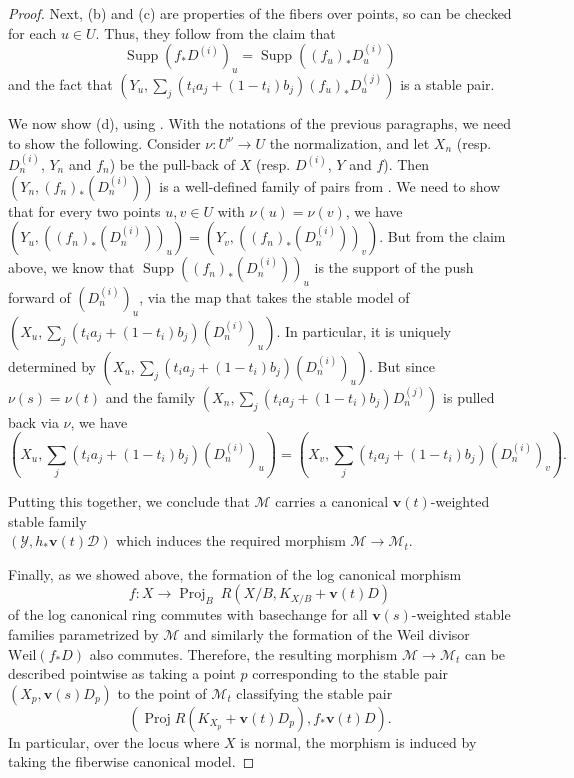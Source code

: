 \documentclass[11pt]{amsart}
\newcommand{\margg}[1]{\normalsize{{\color{red}\footnote{{\color{red}#1}}}{\marginpar[{\color{red}\hfill\tiny\thefootnote$\rightarrow$}]{{\color{red}$\leftarrow$\tiny\thefootnote}}}}}
\newcommand{\Dori}[1]{\margg{(Dori) #1}}
\theoremstyle{definition}
\theoremstyle{remark}
\newcommand{\calY}{\mathcal Y}
\newcommand{\calD}{\mathcal D}
\newcommand{\sM}{\mathscr{M}}
\newcommand{\Supp}{\operatorname{Supp}}
\newcommand{\bfv}{\mathbf{v}}
\begin{document}
\begin{proof}
		
		Next, (b) and (c) are properties of the fibers over points, so can be checked for each $u \in U$. Thus, they follow from the claim that
		$$
		\Supp(f_*D^{(i)})_u = \Supp((f_u)_*D_u^{(i)})
		$$
		and the fact that $\left(Y_u,\sum_j (t_ia_j+(1-t_i)b_j)(f_u)_*D_u^{(j)}\right)$ is a stable pair. 
		
		We now show (d), using \cite[Corollary 4.5]{kollarmodulibook}.
		With the notations of the previous paragraphs, we need to show the following.
		Consider $\nu:U^\nu \to U$ the normalization, and let $X_n$ (resp. $D_n^{(i)}$, $Y_n$ and $f_n$) be the pull-back of $X$
		(resp. $D^{(i)}$, $Y$ and $f$). Then $(Y_n,(f_n)_*(D_n^{(i)}))$ is a well-defined family of pairs from \cite[Theorems 4.3 \& 4.4]{kollarmodulibook}. We need to show that for every two points  $u,v \in U$ with
		$\nu(u)=\nu(v)$, we have $(Y_{u},((f_n)_*(D_n^{(i)}))_{u})=(Y_{v},((f_n)_*(D_n^{(i)}))_{v})$.
		But from the claim above, we know that $\Supp((f_n)_*(D_n^{(i)}))_u$ is the support of the push forward of $(D_n^{(i)})_u$, via the map that takes the stable model of $(X_u,\sum_j (t_ia_j + (1-t_i)b_j) (D^{(i)}_n)_u)$. In particular, it is uniquely determined by $(X_u,\sum_j (t_ia_j + (1-t_i)b_j) (D^{(i)}_n)_u)$.
		But since $\nu(s)=\nu(t)$ and the family $(X_n,\sum_j (t_ia_j + (1-t_i)b_j)D_n^{(j)})$ is pulled back via $\nu$, we have 
		$$(X_u,\sum_j (t_ia_j + (1-t_i)b_j) (D^{(i)}_n)_u)=(X_v,\sum_j (t_ia_j + (1-t_i)b_j) (D^{(i)}_n)_v).$$%
		
		Putting this together, we conclude that $\sM$ carries a canonical $\bfv(t)$-weighted stable family \\ $(\calY, h_*\bfv(t)\calD)$ which induces the required morphism $\sM \to \sM_t$.
		
		Finally, as we showed above, the formation of the log canonical morphism 
		$$
		f : X \to \operatorname{Proj}_B \ R(X/B, K_{X/B} + \bfv(t)D)
		$$ of the log canonical ring commutes with basechange for all $\bfv(s)$-weighted stable families parametrized by $\sM$ and similarly the formation of the Weil divisor $\mathrm{Weil}(f_*D)$ also commutes. Therefore, the resulting morphism $\sM \to \sM_t$ can be described pointwise as taking a point $p$ corresponding to the stable pair $(X_p, \bfv(s)D_p)$ to the point of $\sM_t$ classifying the stable pair $$(\operatorname{Proj} R(K_{X_p} + \bfv(t)D_p), f_*\bfv(t)D).$$ In particular, over the locus where $X$ is normal, the morphism is induced by taking the fiberwise canonical model. \end{proof} 
	
\end{document}
